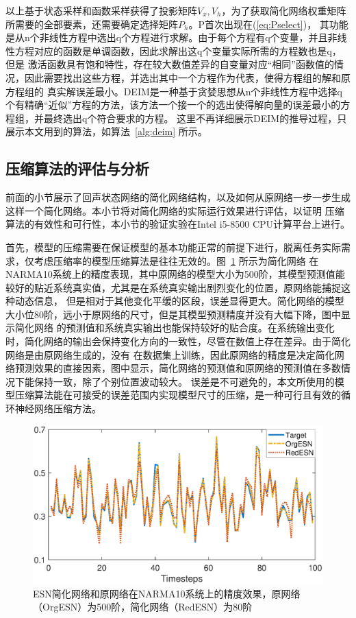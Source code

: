 以上基于状态采样和函数采样获得了投影矩阵\(V_x,V_h\)，为了获取简化网络权重矩阵所需要的全部要素，还需要确定选择矩阵\(P_h\)。P首次出现在(\ref{eq:Pselect})，
其功能是从n个非线性方程中选出q个方程进行求解。由于每个方程有q个变量，并且非线性方程对应的函数是单调函数，因此求解出这q个变量实际所需的方程数也是q，但是
激活函数具有饱和特性，存在较大数值差异的自变量对应“相同”函数值的情况，因此需要找出这些方程，并选出其中一个方程作为代表，使得方程组的解和原方程组的
真实解误差最小。DEIM是一种基于贪婪思想从n个非线性方程中选择q个有精确“近似”方程的方法，该方法一个接一个的选出使得解向量的误差最小的方程组，并最终选出q个符合要求的方程。
这里不再详细展示DEIM的推导过程，只展示本文用到的算法，如算法~\ref{alg:deim} 所示。
\subsection{压缩算法的评估与分析}
前面的小节展示了回声状态网络的简化网络结构，以及如何从原网络一步一步生成这样一个简化网络。本小节将对简化网络的实际运行效果进行评估，以证明
压缩算法的有效性和可行性，本小节的验证实验在Intel i5-8500 CPU计算平台上进行。

首先，模型的压缩需要在保证模型的基本功能正常的前提下进行，脱离任务实际需求，仅考虑压缩率的模型压缩算法是往往无效的。图~\ref{fig:accuracy} 所示为简化网络
在NARMA10系统上的精度表现，其中原网络的模型大小为500阶，其模型预测值能较好的贴近系统真实值，尤其是在系统真实输出剧烈变化的位置，原网络能捕捉这种动态信息，
但是相对于其他变化平缓的区段，误差显得更大。简化网络的模型大小位80阶，远小于原网络的尺寸，但是其模型预测精度并没有大幅下降，图中显示简化网络
的预测值和系统真实输出也能保持较好的贴合度。在系统输出变化时，简化网络的输出会保持变化方向的一致性，尽管在数值上存在差异。由于简化网络是由原网络生成的，没有
在数据集上训练，因此原网络的精度是决定简化网络预测效果的直接因素，图中显示，简化网络的预测值和原网络的预测值在多数情况下能保持一致，除了个别位置波动较大。
误差是不可避免的，本文所使用的模型压缩算法能在可接受的误差范围内实现模型尺寸的压缩，是一种可行且有效的循环神经网络压缩方法。
\begin{figure}
	\centering
	\includegraphics[width=1.0\columnwidth]{exp/500&80_all.eps}
	\caption{ESN简化网络和原网络在NARMA10系统上的精度效果，原网络（OrgESN）为500阶，简化网络（RedESN）为80阶}
	\label{fig:accuracy}
\end{figure}

